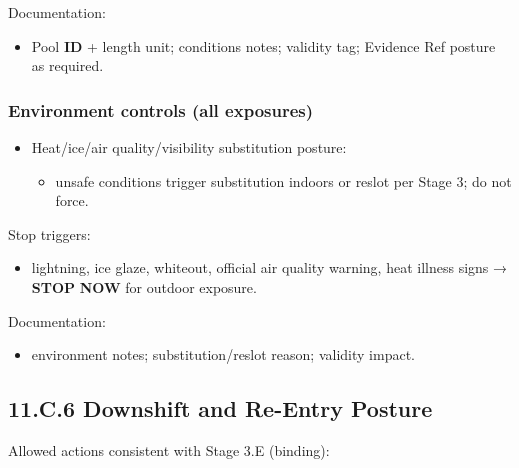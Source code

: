 \documentclass[10pt]{article}
\begin{document}
Documentation:

\begin{itemize}
\item Pool \textbf{ID} + length unit; conditions notes; validity tag; Evidence Ref posture as required.
\end{itemize}

\subsubsection*{Environment controls (all exposures)}

\begin{itemize}
\item Heat/ice/air quality/visibility substitution posture:
\begin{itemize}
\item unsafe conditions trigger substitution indoors or reslot per Stage 3; do not force.
\end{itemize}
\end{itemize}

Stop triggers:

\begin{itemize}
\item lightning, ice glaze, whiteout, official air quality warning, heat illness signs → \textbf{STOP} \textbf{NOW} for outdoor exposure.
\end{itemize}

Documentation:

\begin{itemize}
\item environment notes; substitution/reslot reason; validity impact.
\end{itemize}

\newpage

\subsection*{11.C.6 Downshift and Re-Entry Posture}
{}

Allowed actions consistent with Stage 3.E (binding):
\end{document}
